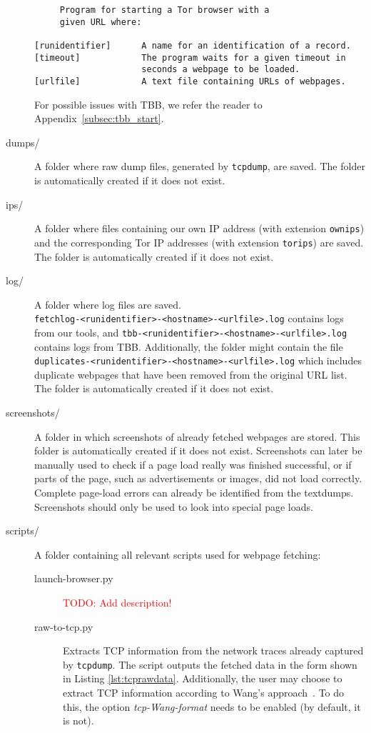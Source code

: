 \begin{description}
\begin{verbatim}
     Program for starting a Tor browser with a
     given URL where:

[runidentifier]      A name for an identification of a record.
[timeout]            The program waits for a given timeout in 
                     seconds a webpage to be loaded.
[urlfile]            A text file containing URLs of webpages.
\end{verbatim}

For possible issues with \ac{TBB}, we refer the reader to Appendix~\ref{subsec:tbb_start}.

\item[dumps/] A folder where raw dump files, generated by \texttt{tcpdump}, are saved. The folder is automatically created if it does not exist. 
\item[ips/] A folder where files containing our own \ac{IP} address (with extension \texttt{ownips}) and the corresponding Tor \ac{IP} addresses (with extension \texttt{torips}) are saved. The folder is automatically created if it does not exist.
\item[log/] A folder where log files are saved.\\ \texttt{fetchlog-<runidentifier>-<hostname>-<urlfile>.log} contains logs from our tools, and \texttt{tbb-<runidentifier>-<hostname>-<urlfile>.log} contains logs from \ac{TBB}. Additionally, the folder might contain the file\\ \texttt{duplicates-<runidentifier>-<hostname>-<urlfile>.log} which includes duplicate webpages that have been removed from the original \ac{URL} list. The folder is automatically created if it does not exist.
\item[screenshots/] A folder in which screenshots of already fetched webpages are stored. This folder is automatically created if it does not exist. Screenshots can later be manually used to check if a page load really was finished successful, or if parts of the page, such as advertisements or images, did not load correctly. Complete page-load errors can already be identified from the textdumps. Screenshots should only be used to look into special page loads.
\item[scripts/] A folder containing all relevant scripts used for webpage fetching:
\begin{description}
\item[launch-browser.py] \textcolor{red}{TODO: Add description!}
\item[raw-to-tcp.py] Extracts \ac{TCP} information from the network traces already captured by \texttt{tcpdump}. The script outputs the fetched data in the form shown in Listing \ref{lst:tcprawdata}. Additionally, the user may choose to extract \ac{TCP} information according to Wang's approach~\cite{Wang2014}. To do this, the option \emph{tcp-Wang-format} needs to be enabled (by default, it is not).

\end{description}
\end{description}
